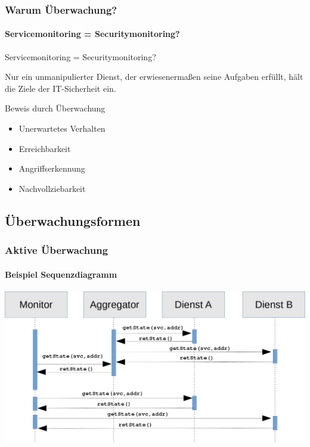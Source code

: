\begin{frame}
    \frametitle{Warum Überwachung?}
        \framesubtitle{Servicemonitoring = Securitymonitoring?}
        
        \begin{alertblock}{\centering Servicemonitoring = Securitymonitoring?}
            \vspace{0.3cm}
            \vspace{0.3cm}
            
            Nur ein unmanipulierter Dienst, der erwiesenermaßen seine
            Aufgaben erfüllt, hält die Ziele der IT-Sicherheit ein.\\
            \vspace{0.3cm}
        \end{alertblock}     
    
        \pause
           
        \begin{alertblock}{Beweis durch Überwachung}
             \begin{itemize}
                 \item Unerwartetes Verhalten
                 \item Erreichbarkeit
                 \item Angriffserkennung
                 \item Nachvollziebarkeit
             \end{itemize}
        \end{alertblock}
    

\end{frame}

\subsection{Überwachungsformen}
\begin{frame}
    \frametitle{Aktive Überwachung}
        \framesubtitle{Beispiel Sequenzdiagramm}
        
        \includegraphics[scale=0.25]{img/sequence_uml_active_trans.png}

\end{frame}


